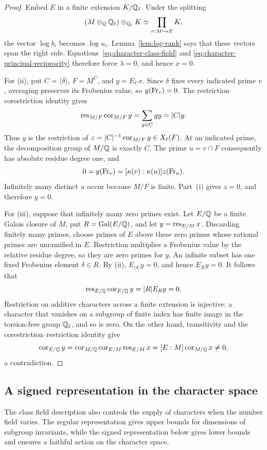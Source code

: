 \begin{proof}
Embed $E$ in a finite extension $K/\mathbb Q_\ell$.  Under the splitting
\[
 (M\otimes_\mathbb Q\mathbb Q_\ell)\otimes_{\mathbb Q_\ell}K
   \simeq\prod_{\sigma:M\hookrightarrow E}K,
\]
the vector $\log b_i$ becomes $\log u_i$.
Lemma~\ref{lem:log-rank} says that these vectors span the right
side.  Equations~\eqref{eq:character-class-field} and
\eqref{eq:character-principal-reciprocity} therefore force
$\lambda=0$, and hence $x=0$.

For (ii), put $C=\langle\delta\rangle$, $F=M^C$, and
$y=E_Cx$.  Since $\delta$ fixes every indicated prime $v$, averaging
preserves its Frobenius value, so $y(\operatorname{Fr}_v)=0$.  The
restriction--corestriction identity gives
\[
 \operatorname{res}_{M/F}\operatorname{cor}_{M/F}y=\sum_{g\in C}g y=|C|y.
\]
Thus $y$ is the restriction of
$z=|C|^{-1}\operatorname{cor}_{M/F}y\in X_{\ell}(F)$.  At an indicated prime,
the decomposition group of $M/\mathbb Q$ is exactly $C$.  The prime
$u=v\cap F$ consequently has absolute residue degree one, and
\[
 0=y(\operatorname{Fr}_v)=[\kappa(v):\kappa(u)]z(\operatorname{Fr}_u).
\]
Infinitely many distinct $u$ occur because $M/F$ is finite.
Part~(i) gives $z=0$, and therefore $y=0$.

For (iii), suppose that infinitely many zero primes exist.  Let
$E/\mathbb Q$ be a finite Galois closure of $M$, put
$R=\operatorname{Gal}(E/\mathbb Q)$, and let $y=\operatorname{res}_{E/M}x$.  Discarding finitely
many primes, choose primes of $E$ above these zero primes whose
rational primes are unramified in $E$.  Restriction multiplies a
Frobenius value by the relative residue degree, so they are zero
primes for $y$.  An infinite subset has one fixed Frobenius element
$\delta\in R$.  By (ii),
$E_{\langle\delta\rangle}y=0$, and hence $E_Ry=0$.  It follows that
\[
 \operatorname{res}_{E/\mathbb Q}\operatorname{cor}_{E/\mathbb Q}y=|R|E_Ry=0.
\]
Restriction on additive characters across a finite extension is
injective: a character that vanishes on a subgroup of finite index
has finite image in the torsion-free group $\mathbb Q_\ell$, and so is
zero.  On the other hand, transitivity and the
corestriction--restriction identity give
\[
 \operatorname{cor}_{E/\mathbb Q}y
 =\operatorname{cor}_{M/\mathbb Q}\operatorname{cor}_{E/M}\operatorname{res}_{E/M}x
 =[E:M]\operatorname{cor}_{M/\mathbb Q}x\ne0,
\]
a contradiction.
\end{proof}

\subsection{A signed representation in the character space}

The class field description also controls the supply of characters
when the number field varies.  The regular representation gives upper
bounds for dimensions of subgroup invariants, while the signed
representation below gives lower bounds and ensures a faithful action
on the character space.

